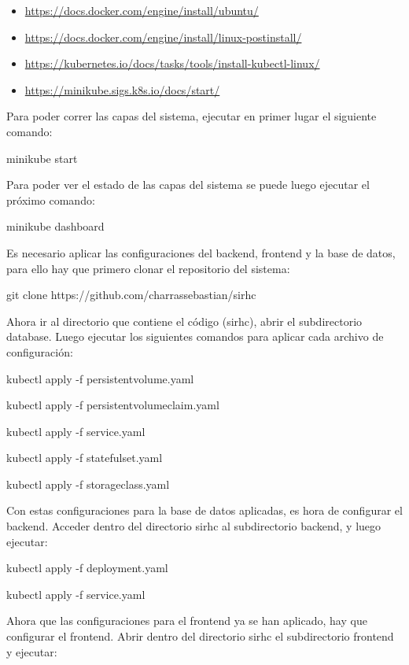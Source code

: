 \documentclass{article}
\begin{document}
\begin{itemize}
    \item \href{https://docs.docker.com/engine/install/ubuntu/}{https://docs.docker.com/engine/install/ubuntu/}
    \item \href{https://docs.docker.com/engine/install/linux-postinstall/}{https://docs.docker.com/engine/install/linux-postinstall/}
    \item \href{https://kubernetes.io/docs/tasks/tools/install-kubectl-linux/}{https://kubernetes.io/docs/tasks/tools/install-kubectl-linux/}
    \item \href{https://minikube.sigs.k8s.io/docs/start/}{https://minikube.sigs.k8s.io/docs/start/}
\end{itemize}

Para poder correr las capas del sistema, ejecutar en primer lugar el siguiente comando:

minikube start

Para poder ver el estado de las capas del sistema se puede luego ejecutar el próximo comando:

minikube dashboard

Es necesario aplicar las configuraciones del backend, frontend y la base de datos, para ello hay que primero clonar el repositorio del sistema:

git clone https://github.com/charrassebastian/sirhc

Ahora ir al directorio que contiene el código (sirhc), abrir el subdirectorio database. Luego ejecutar los siguientes comandos para aplicar cada archivo de configuración:

kubectl apply -f persistentvolume.yaml

kubectl apply -f persistentvolumeclaim.yaml

kubectl apply -f service.yaml

kubectl apply -f statefulset.yaml

kubectl apply -f storageclass.yaml

Con estas configuraciones para la base de datos aplicadas, es hora de configurar el backend. Acceder dentro del directorio sirhc al subdirectorio backend, y luego ejecutar:

kubectl apply -f deployment.yaml

kubectl apply -f service.yaml

Ahora que las configuraciones para el frontend ya se han aplicado, hay que configurar el frontend. Abrir dentro del directorio sirhc  el subdirectorio frontend y ejecutar:
\end{document}
